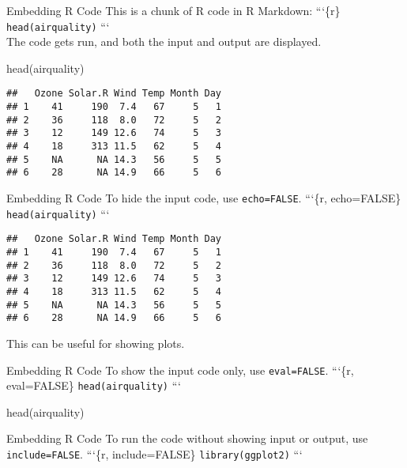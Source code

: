 \documentclass[
  ignorenonframetext,
]{beamer}
\newenvironment{Shaded}{\begin{snugshade}}{\end{snugshade}}
\newcommand{\FunctionTok}[1]{\textcolor[rgb]{0.00,0.00,0.00}{#1}}
\newcommand{\NormalTok}[1]{#1}
\begin{document}
\begin{frame}[fragile]{Embedding R Code}
\protect\hypertarget{embedding-r-code}{}
This is a chunk of R code in R Markdown: ```\{r\}
\texttt{head(airquality)} ```\\
The code gets run, and both the input and output are displayed.

\begin{Shaded}
\begin{Highlighting}[]
\FunctionTok{head}\NormalTok{(airquality)}
\end{Highlighting}
\end{Shaded}

\begin{verbatim}
##   Ozone Solar.R Wind Temp Month Day
## 1    41     190  7.4   67     5   1
## 2    36     118  8.0   72     5   2
## 3    12     149 12.6   74     5   3
## 4    18     313 11.5   62     5   4
## 5    NA      NA 14.3   56     5   5
## 6    28      NA 14.9   66     5   6
\end{verbatim}
\end{frame}

\begin{frame}[fragile]{Embedding R Code}
\protect\hypertarget{embedding-r-code-1}{}
To hide the input code, use \texttt{echo=FALSE}. ```\{r, echo=FALSE\}
\texttt{head(airquality)} ```

\begin{verbatim}
##   Ozone Solar.R Wind Temp Month Day
## 1    41     190  7.4   67     5   1
## 2    36     118  8.0   72     5   2
## 3    12     149 12.6   74     5   3
## 4    18     313 11.5   62     5   4
## 5    NA      NA 14.3   56     5   5
## 6    28      NA 14.9   66     5   6
\end{verbatim}

This can be useful for showing plots.
\end{frame}

\begin{frame}[fragile]{Embedding R Code}
\protect\hypertarget{embedding-r-code-2}{}
To show the input code only, use \texttt{eval=FALSE}. ```\{r,
eval=FALSE\} \texttt{head(airquality)} ```

\begin{Shaded}
\begin{Highlighting}[]
\FunctionTok{head}\NormalTok{(airquality)}
\end{Highlighting}
\end{Shaded}
\end{frame}

\begin{frame}[fragile]{Embedding R Code}
\protect\hypertarget{embedding-r-code-3}{}
To run the code without showing input or output, use
\texttt{include=FALSE}. ```\{r, include=FALSE\}
\texttt{library(ggplot2)} ```
\end{frame}
\end{document}
